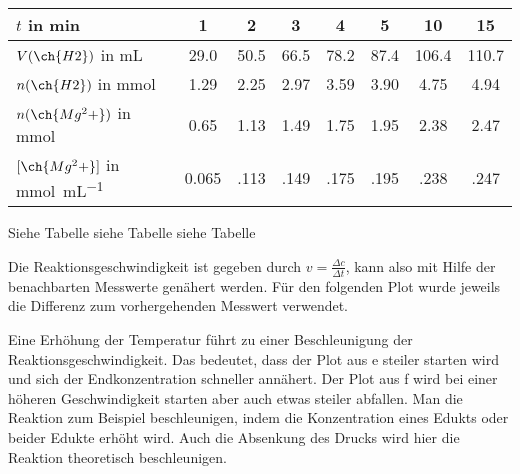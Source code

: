 \documentclass[DIV11]{scrartcl}
\begin{document}
\begin{solution}
\begin{center}
 \begin{tabular}{ l*{5}{S[table-format=2.3]}*{2}{S[table-format=3.3]} }
  \toprule
   $t$ in \si{\minute}
     &  1     &  2     &  3     &  4     &  5     &  10     &  15 \\
  \midrule
   $V(\ch{H2})$ in \si{\milli\liter}
     & 29.0   & 50.5   & 66.5   & 78.2   & 87.4   & 106.4   & 110.7 \\
   $n(\ch{H2})$ in \si{\milli\mole}
     &  1.29  &  2.25  &  2.97  &  3.59  &  3.90  &   4.75  &   4.94 \\
   $n(\ch{Mg^2+})$ in \si{\milli\mole}
     &  0.65  &  1.13  &  1.49  &  1.75  &  1.95  &   2.38  &   2.47 \\
   $[\ch{Mg^2+}]$ in \si{\milli\mole\per\milli\liter}
     &  0.065 &   .113 &   .149 &   .175 &   .195 &    .238 &    .247 \\
  \bottomrule
 \end{tabular}
\end{center}
\begin{tasks}
 \task Siehe Tabelle
 \task {}
 \task siehe Tabelle
 \task siehe Tabelle
 \task {}
 \task Die Reaktionsgeschwindigkeit ist gegeben durch $v=\frac{\Delta
     c}{\Delta t}$,  kann also mit Hilfe der benachbarten Messwerte genähert
   werden.  Für den folgenden Plot wurde jeweils die Differenz zum
   vorhergehenden Messwert verwendet.
   
 \task Eine Erhöhung der Temperatur führt zu einer Beschleunigung der
   Reaktionsgeschwindigkeit.  Das bedeutet, dass der Plot aus e steiler
   starten  wird und sich der Endkonzentration schneller annähert.  Der Plot
   aus f wird bei einer höheren Geschwindigkeit starten aber auch etwas
   steiler abfallen.
 \task Man die Reaktion zum Beispiel beschleunigen, indem die Konzentration
   eines Edukts oder beider Edukte erhöht wird.  Auch die Absenkung des Drucks
   wird hier die Reaktion theoretisch beschleunigen.
\end{tasks}
\end{solution}
\end{document}
